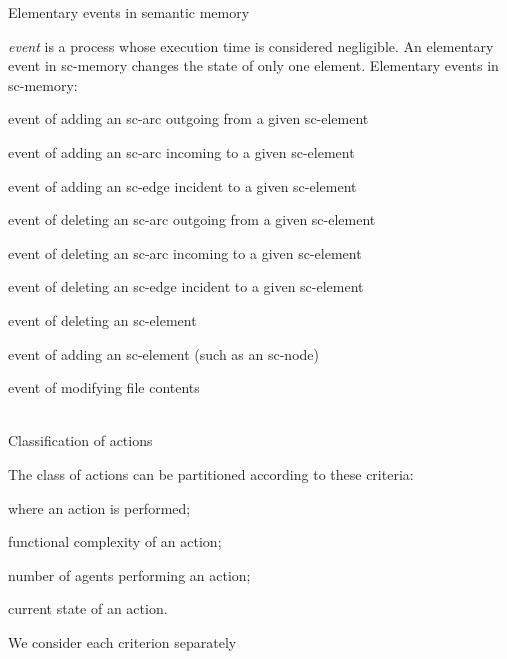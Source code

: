 \begin{frame}{Elementary events in semantic memory}
\topline
\justifying
\vspace{10mm}

\textit{event} is a process whose execution time is considered negligible. An elementary event in sc-memory changes the state of only one element.
Elementary events in sc-memory:
\begin{textitemize}
    \item event of adding an sc-arc outgoing from a given sc-element
    \item event of adding an sc-arc incoming to a given sc-element
    \item event of adding an sc-edge incident to a given sc-element
    \item event of deleting an sc-arc outgoing from a given sc-element
    \item event of deleting an sc-arc incoming to a given sc-element
    \item event of deleting an sc-edge incident to a given sc-element
    \item event of deleting an sc-element
    \item event of adding an sc-element (such as an sc-node)
    \item event of modifying file contents
\end{textitemize}
\end{frame}

\begin{frame}{\\Classification of actions}
\topline
\justifying

The class of actions can be partitioned according to these criteria:
\begin{textitemize}
	\item where an action is performed;
	\item functional complexity of an action;
	\item number of agents performing an action;
	\item current state of an action.
\end{textitemize}
We consider each criterion separately
\end{frame}

